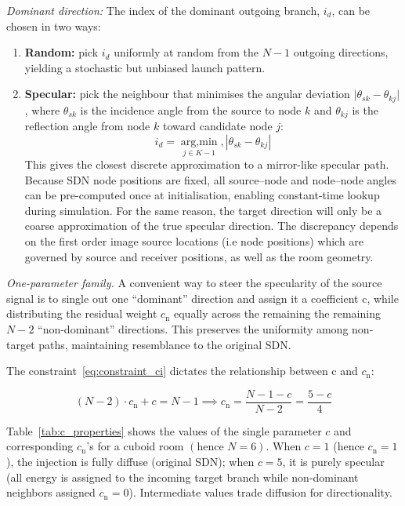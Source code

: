 \documentclass[journal]{IEEEtran}
\begin{document}
\textit{Dominant direction:} The index of the dominant outgoing branch, \(i_d\), can be chosen in two
ways:

\begin{enumerate}
  \item \textbf{Random:} pick \(i_d\) uniformly at random from the
        \(N-1\) outgoing directions, yielding a stochastic but
        unbiased launch pattern.
  \item \textbf{Specular:} pick the neighbour that minimises the angular
        deviation
        \(\lvert\theta_{sk}-\theta_{kj}\rvert\), where
        \(\theta_{sk}\) is the incidence angle from the source to node
        \(k\) and \(\theta_{kj}\) is the reflection angle from node
        \(k\) toward candidate node \(j\):
        \begin{equation}
        \label{eq:specular_id_selection}
        i_{d} = \mathop{\mathrm{arg,min}}\limits_{j \in {K-1}} , \left| \theta_{sk} - \theta_{kj} \right|
        \end{equation}
        This gives the closest discrete approximation to a
        mirror-like specular path.  Because SDN node positions are
        fixed, all source–node and node–node angles can be
        pre-computed once at initialisation, enabling constant-time lookup during simulation. For the same reason, the target direction will only be a coarse approximation of the true specular direction. The discrepancy depends on the first order image source locations (i.e node positions) which are governed by source and receiver positions, as well as the room geometry.
\end{enumerate}

\textit{One-parameter family.}
A convenient way to steer the specularity of the source signal is to single out one “dominant” direction and assign it a coefficient c, while distributing the residual weight \(c_{\text{n}}\) equally across the remaining the remaining \(N-2\) “non-dominant” directions. This preserves the uniformity among non-target paths, maintaining resemblance to the original SDN.

The constraint~\eqref{eq:constraint_ci} dictates the relationship between c and \(c_{\text{n}}\):

\begin{equation}
\label{eq:constraint_ci_simplified}
 (N-2) \cdot c_{\text{n}} + c = N-1 \implies c_{\text{n}} = \frac{N-1-c}{N-2} = \frac{5-c}{4}
\end{equation}

Table~\ref{tab:c_properties} shows the values of the single parameter \(c\) and corresponding \(c_{\text{n}}\)'s for a cuboid room \((\text{hence }N=6)\). 
When \(c=1\) (hence \(c_{\text{n}}=1\)), the injection is fully diffuse (original SDN); when \(c=5\), it is purely specular (all energy is assigned to the incoming target branch while non-dominant neighbors assigned $c_{\text{n}}=0$). 
Intermediate values trade diffusion for directionality.
\end{document}
